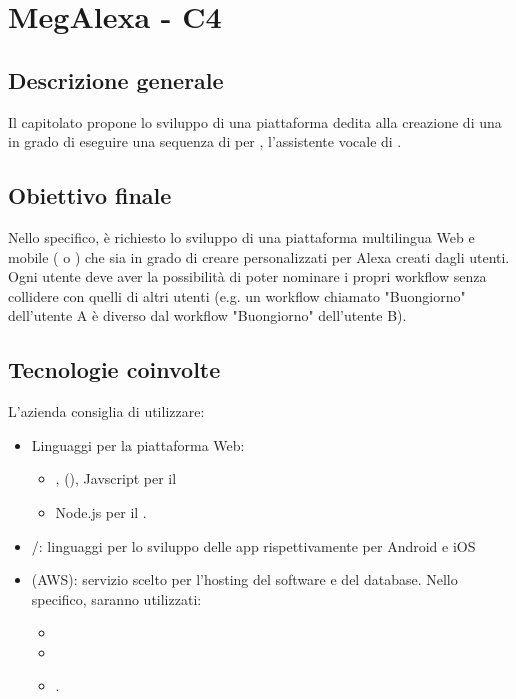 \section{MegAlexa - C4} \label{c4}

    \subsection{Descrizione generale}
    Il capitolato propone lo sviluppo di una piattaforma
    dedita alla creazione di una  in grado di eseguire una sequenza
    di  per , l'assistente vocale di .

    \subsection{Obiettivo finale}
    Nello specifico, \`e richiesto lo sviluppo di una piattaforma multilingua Web e
    mobile ( o ) che sia in grado di
    creare  personalizzati per Alexa creati dagli utenti. Ogni utente
    deve aver la possibilit\`a di poter nominare i propri workflow senza collidere con
    quelli di altri utenti (e.g. un workflow chiamato "Buongiorno" dell'utente A \`e
    diverso dal workflow "Buongiorno" dell'utente B).

    \subsection{Tecnologie coinvolte}
    L'azienda consiglia di utilizzare:
    \begin{itemize}
    	\item Linguaggi per la piattaforma Web:
    	\begin{itemize}
            \item {},  (), Javscript
                per il 
            \item Node.js per il .
    	\end{itemize}
        \item {}/: linguaggi per lo sviluppo delle app
            rispettivamente per Android e iOS
        \item {} (AWS): servizio scelto per l'hosting del software e del database.
            Nello specifico, saranno utilizzati:
            \begin{itemize}
                \item {}
                \item {}
                \item {}.
            \end{itemize}
    \end{itemize}

